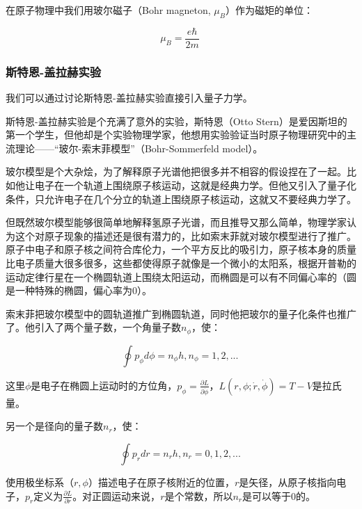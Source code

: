 在原子物理中我们用玻尔磁子（Bohr magneton, $\mu_B$）作为磁矩的单位：

\begin{equation}
\mu_B = \frac{e \hbar }{ 2 m} ~
\end{equation}



\subsubsection{斯特恩-盖拉赫实验}

我们可以通过讨论斯特恩-盖拉赫实验直接引入量子力学。

斯特恩-盖拉赫实验是个充满了意外的实验，斯特恩（Otto Stern）是爱因斯坦的第一个学生，但他却是个实验物理学家，他想用实验验证当时原子物理研究中的主流理论——“玻尔-索末菲模型”（Bohr-Sommerfeld model）。

玻尔模型是个大杂烩，为了解释原子光谱他把很多并不相容的假设捏在了一起。比如他让电子在一个轨道上围绕原子核运动，这就是经典力学。但他又引入了量子化条件，只允许电子在几个分立的轨道上围绕原子核运动，这就又不要经典力学了。

但既然玻尔模型能够很简单地解释氢原子光谱，而且推导又那么简单，物理学家认为这个对原子现象的描述还是很有潜力的，比如索末菲就对玻尔模型进行了推广。原子中电子和原子核之间符合库伦力，一个平方反比的吸引力，原子核本身的质量比电子质量大很多很多，这些都使得原子就像是一个微小的太阳系，根据开普勒的运动定律行星在一个椭圆轨道上围绕太阳运动，而椭圆是可以有不同偏心率的（圆是一种特殊的椭圆，偏心率为0）。

索末菲把玻尔模型中的圆轨道推广到椭圆轨道，同时他把玻尔的量子化条件也推广了。他引入了两个量子数，一个角量子数$n_\phi$，使：

\begin{equation}
\oint p_\phi d \phi = n_\phi h , n_\phi = 1, 2, ...~
\end{equation}

这里$\phi$是电子在椭圆上运动时的方位角，$p_\phi = \frac{\partial L }{\partial \dot \phi }$，$L ( r, \phi; \dot r , \dot \phi  ) = T - V$是拉氏量。

另一个是径向的量子数$n_r$，使：

\begin{equation}
\oint p_r dr = n_r h , n_r = 0, 1, 2, ...~
\end{equation}

使用极坐标系（$r , \phi$）描述电子在原子核附近的位置，$r$是矢径，从原子核指向电子，$p_r$定义为$\frac{\partial L }{\partial \dot r }$。对正圆运动来说，$r$是个常数，所以$n_r$是可以等于0的。


